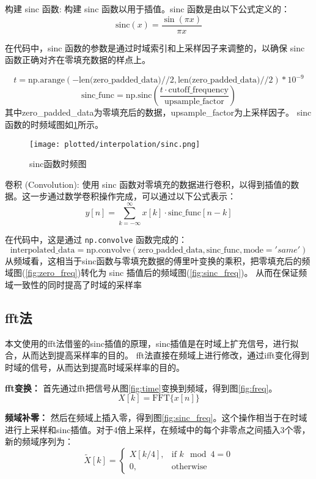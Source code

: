 构建 sinc 函数:
构建 sinc 函数以用于插值。sinc 函数是由以下公式定义的：
\[
    \text{sinc}(x) = \dfrac{\sin(\pi x)}{\pi x}
\]

在代码中，sinc 函数的参数是通过时域索引和上采样因子来调整的，以确保 sinc 函数正确对齐在零填充数据的样点上。

\[
    t = \text{np.arange}(-\text{len(zero\_padded\_data)}//2, \text{len(zero\_padded\_data)}//2) * 10^{-9}
\]
\[
    \text{sinc\_func} = \text{np.sinc}(\frac{t \cdot \text{cutoff\_frequency}}{\text{upsample\_factor} })
\]
其中zero\_padded\_data为零填充后的数据，upsample\_factor为上采样因子。
sinc函数的时频域图如\ref{fig:sinc}所示。
\begin{figure}[htbp]
    \centering
    \texttt{[image: plotted/interpolation/sinc.png]}
    \caption{\label{fig:sinc}sinc函数时频图}
\end{figure}

卷积 (Convolution):
使用 sinc 函数对零填充的数据进行卷积，以得到插值的数据。这一步通过数学卷积操作完成，可以通过以下公式表示：
\[
    y[n] = \sum_{k=-\infty}^{\infty} x[k] \cdot \text{sinc\_func}[n - k]
\]

在代码中，这是通过 \texttt{np.convolve} 函数完成的：
\[
    \text{interpolated\_data} = \text{np.convolve}(\text{zero\_padded\_data}, \text{sinc\_func}, \text{mode}='same')
\]
从频域看，这相当于sinc函数与零填充数据的傅里叶变换的乘积，把零填充后的频域图(\ref{fig:zero_freq})转化为 sinc 插值后的频域图(\ref{fig:sinc_freq})。
从而在保证频域一致性的同时提高了时域的采样率

\subsection{fft法}
本文使用的fft法借鉴的sinc插值的原理，sinc插值是在时域上扩充信号，进行拟合，从而达到提高采样率的目的。
fft法直接在频域上进行修改，通过ifft变化得到时域的信号，从而达到提高时域采样率的目的。

\textbf{fft变换：}
首先通过fft把信号从图\ref{fig:time}变换到频域，得到图\ref{fig:freq}。
\[ X[k] = \text{FFT}\{ x[n] \} \]

\textbf{频域补零：}
然后在频域上插入零，得到图\ref{fig:sinc_freq}。这个操作相当于在时域进行上采样和sinc插值。对于4倍上采样，在频域中的每个非零点之间插入3个零，新的频域序列为：
\[ \tilde{X}[k] = \begin{cases}
X[k/4], & \text{if } k \mod 4 = 0 \\
0, & \text{otherwise}
\end{cases} \]

